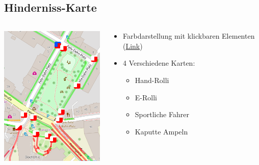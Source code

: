 \documentclass{beamer}
\begin{document}
\subsection{Hinderniss-Karte}

\begin{frame}{}

  \begin{columns}[c]

    \begin{column}[T]{.6\textwidth}
      \begin{center}
      \vspace{-0.3cm}
      \includegraphics[width=5.5cm]{hindernisse.png}
      \end{center}

    \end{column}
    \begin{column}[T]{.4\textwidth}

      \begin{itemize}
      \vspace{1cm}
          \item Farbdarstellung mit klickbaren Elementen (\href{http://species.github.io/wheelchair-obstacles/normal.html\#18/47.06588/15.45369}{Link})

      \vspace{1cm}

            \item 4 Verschiedene Karten:

              \begin{itemize}
                \item Hand-Rolli
                \item E-Rolli
                \item Sportliche Fahrer
                \item Kaputte Ampeln
              \end{itemize}
        \end{itemize}

    \end{column}
  \end{columns}

\end{frame}
\end{document}
